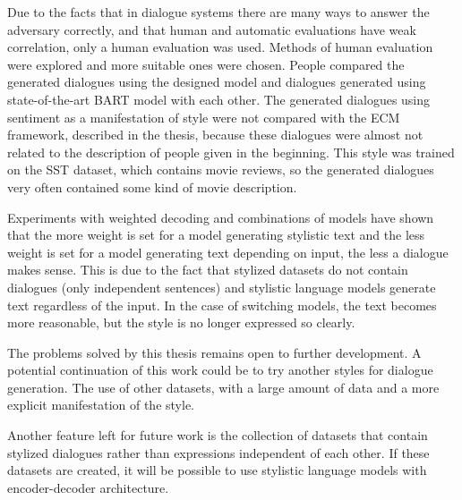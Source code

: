 Due to the facts that in dialogue systems there are many ways to answer the adversary correctly, and that human and automatic evaluations have weak
correlation, only a human evaluation was used. Methods of human evaluation were explored and more suitable ones were chosen. People compared the generated dialogues using the designed model and dialogues generated using state-of-the-art BART model with each other. The generated dialogues using sentiment as a manifestation of style were not compared with the ECM framework, described in the thesis, because these dialogues were almost not related to the description of people given in the beginning. This style was trained on the SST dataset, which contains movie reviews, so the generated dialogues very often contained some kind of movie description.

Experiments with weighted decoding and combinations of models have shown that the more weight is set for a model generating stylistic text and the less weight is set for a model generating text depending on input, the less a dialogue makes sense. This is due to the fact that stylized datasets do not contain dialogues (only independent sentences) and stylistic language models generate text regardless of the input. In the case of switching models, the text becomes more reasonable, but the style is no longer expressed so clearly.

The problems solved by this thesis remains open to further development. A potential continuation of this work could be to try another styles for dialogue generation. The use of other datasets, with a large amount of data and a more explicit manifestation of the style. 

Another feature left for future work is the collection of datasets that contain stylized dialogues rather than expressions independent of each other. If these datasets are created, it will be possible to use stylistic language models with encoder-decoder architecture.


